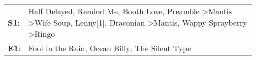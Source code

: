 \begin{supertabular}{p{0.03\textwidth}p{0.92\textwidth}}
 \textbf{S1}:  &  Half Delayed\textsuperscript{}, \enspace Remind Me\textsuperscript{}, \enspace Booth Love\textsuperscript{}, \enspace Preamble\textsuperscript{} \textgreater \enspace Mantis\textsuperscript{} \textgreater \enspace Wife Soup\textsuperscript{}, \enspace Lenny[1]\textsuperscript{}, \enspace Draconian\textsuperscript{} \textgreater \enspace Mantis\textsuperscript{}, \enspace Wappy Sprayberry\textsuperscript{} \textgreater \enspace Ringo\textsuperscript{}  \enspace  \\
 \textbf{E1}:  &                                                                                                                                                                                                                                                                                                                                                  Fool in the Rain\textsuperscript{}, \enspace Ocean Billy\textsuperscript{}, \enspace The Silent Type\textsuperscript{}  \enspace  \\
\end{supertabular}
